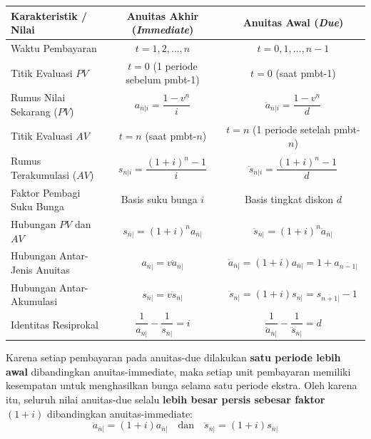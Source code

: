 \documentclass[11pt,a4paper]{article}
\begin{document}
\begin{center}
\small
\setlength{\tabcolsep}{4.5pt}
\renewcommand{\arraystretch}{1.25}
\begin{tabular}{lcc}
\toprule
\textbf{Karakteristik / Nilai} & \textbf{Anuitas Akhir (\textit{Immediate})} & \textbf{Anuitas Awal (\textit{Due})} \\
\midrule
Waktu Pembayaran & $t = 1, 2, \dots, n$ & $t = 0, 1, \dots, n-1$ \\
Titik Evaluasi $PV$ & $t = 0$ (1 periode sebelum pmbt-1) & $t = 0$ (saat pmbt-1) \\
Rumus Nilai Sekarang ($PV$) & $a_{\overline{n}|i} = \dfrac{1 - v^n}{i}$ & $\ddot{a}_{\overline{n}|i} = \dfrac{1 - v^n}{d}$ \\
Titik Evaluasi $AV$ & $t = n$ (saat pmbt-$n$) & $t = n$ (1 periode setelah pmbt-$n$) \\
Rumus Terakumulasi ($AV$) & $s_{\overline{n}|i} = \dfrac{(1+i)^n - 1}{i}$ & $\ddot{s}_{\overline{n}|i} = \dfrac{(1+i)^n - 1}{d}$ \\
Faktor Pembagi Suku Bunga & Basis suku bunga $i$ & Basis tingkat diskon $d$ \\
Hubungan $PV$ dan $AV$ & $s_{\overline{n}|} = (1+i)^n a_{\overline{n}|}$ & $\ddot{s}_{\overline{n}|} = (1+i)^n \ddot{a}_{\overline{n}|}$ \\
Hubungan Antar-Jenis Anuitas & $a_{\overline{n}|} = v \ddot{a}_{\overline{n}|}$ & $\ddot{a}_{\overline{n}|} = (1+i) a_{\overline{n}|} = 1 + a_{\overline{n-1}|}$ \\
Hubungan Antar-Akumulasi & $s_{\overline{n}|} = v \ddot{s}_{\overline{n}|}$ & $\ddot{s}_{\overline{n}|} = (1+i) s_{\overline{n}|} = s_{\overline{n+1}|} - 1$ \\
Identitas Resiprokal & $\dfrac{1}{a_{\overline{n}|}} - \dfrac{1}{s_{\overline{n}|}} = i$ & $\dfrac{1}{\ddot{a}_{\overline{n}|}} - \dfrac{1}{\ddot{s}_{\overline{n}|}} = d$ \\
\bottomrule
\end{tabular}
\end{center}

\begin{notebox}
Karena setiap pembayaran pada anuitas-due dilakukan \textbf{satu periode lebih awal} dibandingkan anuitas-immediate, maka setiap unit pembayaran memiliki kesempatan untuk menghasilkan bunga selama satu periode ekstra. Oleh karena itu, seluruh nilai anuitas-due selalu \textbf{lebih besar persis sebesar faktor $(1+i)$} dibandingkan anuitas-immediate:
\begin{equation}
    \ddot{a}_{\overline{n}|} = (1+i) a_{\overline{n}|} \quad \text{dan} \quad \ddot{s}_{\overline{n}|} = (1+i) s_{\overline{n}|}
\end{equation}
\end{notebox}
\end{document}
